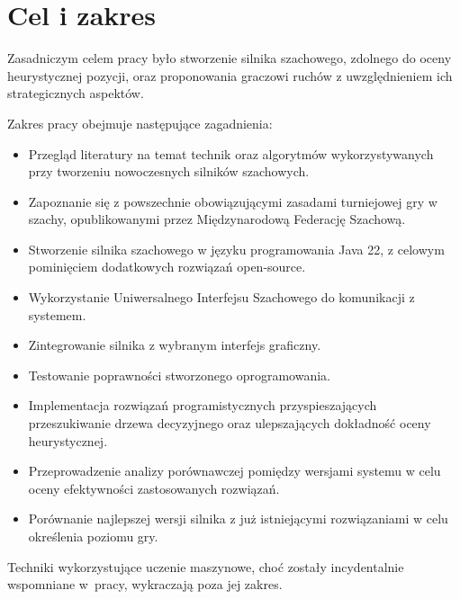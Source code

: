 \section{Cel i zakres}
\label{sec:cel-i-zakres}

Zasadniczym celem pracy było stworzenie silnika szachowego, zdolnego do oceny heurystycznej pozycji, oraz proponowania graczowi ruchów z uwzględnieniem ich strategicznych aspektów.

Zakres pracy obejmuje następujące zagadnienia:
\begin{itemize}
    \item Przegląd literatury na temat technik oraz algorytmów wykorzystywanych przy tworzeniu nowoczesnych silników szachowych.
    \item Zapoznanie się z powszechnie obowiązującymi zasadami turniejowej gry w szachy, opublikowanymi przez Międzynarodową Federację Szachową.
    \item Stworzenie silnika szachowego w języku programowania Java 22, z celowym pominięciem dodatkowych rozwiązań open-source.
    \item Wykorzystanie Uniwersalnego Interfejsu Szachowego do komunikacji z systemem.
    \item Zintegrowanie silnika z wybranym interfejs graficzny.
    \item Testowanie poprawności stworzonego oprogramowania.
    \item Implementacja rozwiązań programistycznych przyspieszających przeszukiwanie drzewa decyzyjnego oraz ulepszających dokładność oceny heurystycznej.
    \item Przeprowadzenie analizy porównawczej pomiędzy wersjami systemu w celu oceny efektywności zastosowanych rozwiązań.
    \item Porównanie najlepszej wersji silnika z już istniejącymi rozwiązaniami w celu określenia poziomu gry.
\end{itemize}

Techniki wykorzystujące uczenie maszynowe, choć zostały incydentalnie wspomniane w~pracy, wykraczają poza jej zakres.

